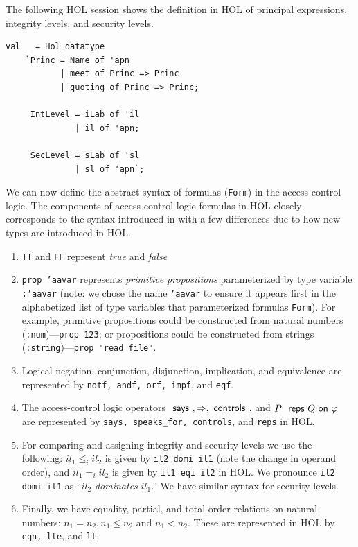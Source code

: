The following HOL session shows the definition in HOL of principal
expressions, integrity levels, and security levels.

\setcounter{sessioncount}{0}
\begin{session}
\begin{verbatim}
val _ = Hol_datatype 
    `Princ = Name of 'apn
           | meet of Princ => Princ
           | quoting of Princ => Princ;

     IntLevel = iLab of 'il
              | il of 'apn;

     SecLevel = sLab of 'sl
              | sl of 'apn`;
\end{verbatim}
\end{session}

We can now define the abstract syntax of formulas (\texttt{Form}) in
the access-control logic. The components of access-control logic
formulas in HOL closely corresponds to the syntax introduced in
\cite{ACST} with a few differences due to how new types are introduced
in HOL.
\begin{enumerate}
\item \texttt{TT} and \texttt{FF} represent \emph{true} and \emph{false}
\item \texttt{prop 'aavar} represents \emph{primitive propositions}
  parameterized by type variable \texttt{:'aavar} (note: we chose the
  name \texttt{'aavar} to ensure it appears first in the alphabetized
  list of type variables that parameterized formulas
  \texttt{Form}). For example, primitive propositions could be
  constructed from natural numbers (\texttt{:num})---\texttt{prop 123};
  or propositions could be constructed from strings
  (\texttt{:string})---\texttt{prop "read file"}.
\item Logical negation, conjunction, disjunction, implication, and
  equivalence are represented by \texttt{notf, andf, orf, impf}, and
  \texttt{eqf}.
\item The access-control logic operators $\textsf{ says }, \Rightarrow,
  \textsf{ controls }$, and ${P} {\text{ \textsf{ reps }}}{Q}{\text{\textsf{ on }}}{\varphi}$ are represented by
  \texttt{says, speaks\_for, controls}, and \texttt{reps} in HOL.
\item For comparing and assigning integrity and security levels we use
  the following: $il_1 \leq_i il_2$ is given by \texttt{il2 domi il1}
  (note the change in operand order), and $il_1 =_i il_2$ is given by
  \texttt{il1 eqi il2} in HOL. We pronounce \texttt{il2 domi il1} as
  ``$il_2$ \emph{dominates} $il_1$.'' We have similar syntax for security
  levels.
\item Finally, we have equality, partial, and total order relations on
  natural numbers: $n_1 = n_2, n_1 \leq n_2$ and $n_1 < n_2$. These
  are represented in HOL by \texttt{eqn, lte}, and \texttt{lt}.
\end{enumerate}

